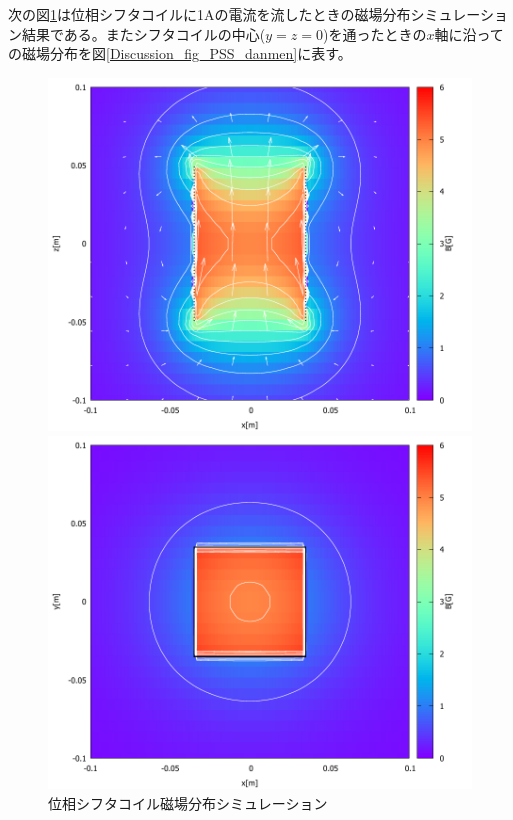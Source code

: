次の図\ref{Discussion_fig_PhaseShifterSimulation}は位相シフタコイルに1Aの電流を流したときの磁場分布シミュレーション結果である。またシフタコイルの中心($y=z=0$)を通ったときの$x$軸に沿っての磁場分布を図\ref{Discussion_fig_PSS_danmen}に表す。
\begin{figure}[h]
\begin{minipage}{0.5\hsize}
\centering
\includegraphics[width=\hsize]{discussion/B/coil11_image1.pdf}
\end{minipage}
\begin{minipage}{0.5\hsize}
\centering
\includegraphics[width=\hsize]{discussion/B/coil11_image2.pdf}
\end{minipage}
\caption{位相シフタコイル磁場分布シミュレーション} \label{Discussion_fig_PhaseShifterSimulation}
\end{figure}
